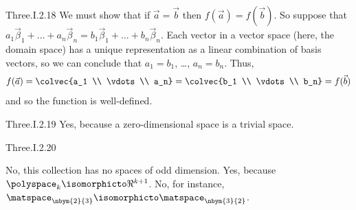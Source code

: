 \begin{ans}{Three.I.2.18}
        We must show that if \( \vec{a}=\vec{b} \) then
        \( f(\vec{a})=f(\vec{b}) \).
        So suppose that
        $a_1\vec{\beta}_1+\dots+a_n\vec{\beta}_n
           =b_1\vec{\beta}_1+\dots+b_n\vec{\beta}_n$.
        Each vector in a vector space (here, the domain space)
        has a unique representation as a linear combination
        of basis vectors, so we can conclude that \( a_1=b_1 \), \ldots,
        \(a_n=b_n \).
        Thus,
        \begin{equation*}
          f(\vec{a})
          =\colvec{a_1 \\ \vdots \\ a_n}=\colvec{b_1 \\ \vdots \\ b_n}
          =f(\vec{b})
        \end{equation*}
        and so the function is well-defined.
     
\end{ans}
\begin{ans}{Three.I.2.19}
       Yes, because a zero-dimensional space is a trivial space.
     
\end{ans}
\begin{ans}{Three.I.2.20}
      \begin{exparts}
        \partsitem No, this collection has no spaces of odd dimension.
        \partsitem Yes, because $\polyspace_{k}\isomorphicto\Re^{k+1}$.
        \partsitem No, for instance,
          \( \matspace_{\nbym{2}{3}}\isomorphicto\matspace_{\nbym{3}{2}} \).
      \end{exparts}
    
\end{ans}
